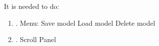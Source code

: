 \documentclass{article}
\begin{document}
\pagestyle{empty}

It is needed to do:
\begin{enumerate}
\item{.} Menu:
 Save model
 Load model
 Delete model

\item{.}  Scroll Panel



\end{enumerate}
\end{document}
